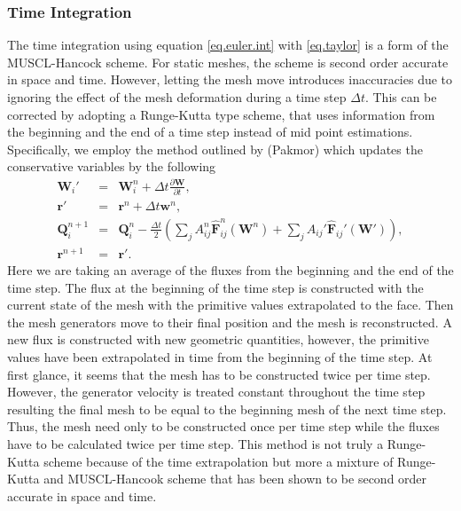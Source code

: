 \subsubsection{Time Integration}
The time integration using equation \ref{eq.euler.int} with \ref{eq.taylor} is
a form of the MUSCL-Hancock scheme. For static meshes, the scheme is second
order accurate in space and time. However, letting the mesh move introduces
inaccuracies due to ignoring the effect of the mesh deformation during a time 
step $\Delta t$. This can be corrected by adopting a Runge-Kutta type scheme, that
uses information from the beginning and the end of a time step instead of mid
point estimations. Specifically, we employ the method outlined by (Pakmor)
which updates the conservative variables by the following
\begin{equation}
	\begin{array}{rcl}
		\mathbf{W}_i' & = & \mathbf{W}_i^n + 
        	\Delta t\frac{\partial\mathbf{W}}{\partial t}, \\
        \mathbf{r}' & = & \mathbf{r}^n + \Delta t\mathbf{w}^n, \\
        \mathbf{Q}_i^{n+1} & = & \mathbf{Q}_i^n -
        	\frac{\Delta t}{2}\left(\sum_j A_{ij}^n\mathbf{\hat{F}}_{ij}^n
            (\mathbf{W}^n) + \sum_j A_{ij}'\mathbf{\hat{F}}_{ij}'
            (\mathbf{W}')\right), \\
        \mathbf{r}^{n+1} & = & \mathbf{r}'.
    \end{array}
\end{equation}
Here we are taking an average of the fluxes from the beginning and the end
of the time step. The flux at the beginning of the time step is constructed
with the current state of the mesh with the primitive values extrapolated to
the face. Then the mesh generators move to their final position
and the mesh is reconstructed. A new flux is constructed with new geometric
quantities, however, the primitive values have been extrapolated in time from
the beginning of the time step. At first glance, it seems that the mesh has
to be constructed twice per time step. However, the generator velocity is
treated constant throughout the time step resulting the final mesh to be equal to
the beginning mesh of the next time step. Thus, the mesh need only to
be constructed once per time step while the fluxes have to be calculated
twice per time step. This method is not truly a Runge-Kutta scheme because
of the time extrapolation but more a mixture of Runge-Kutta and MUSCL-Hancook
scheme that has been shown to be second order accurate in space and time.

